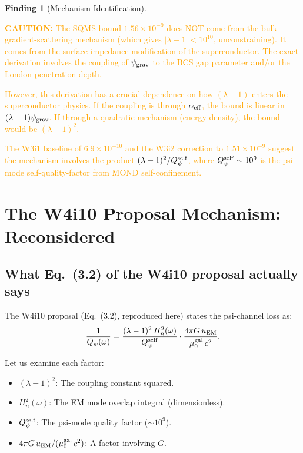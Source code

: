 \documentclass[11pt]{article}
\newcommand{\lam}{\lambda}
\newcommand{\lbone}{|\lambda - 1|}
\newcommand{\Qpsi}{Q_\psi}
\newcommand{\ee}[1]{\times 10^{#1}}
\newcommand{\Heff}{H_n}
\newcommand{\muG}{\mu_0^{\rm gal}}
\newcommand{\psigrav}{\psi_{\rm grav}}
\newcommand{\caution}[1]{\textcolor{orange}{\textbf{CAUTION:} #1}}
\theoremstyle{definition}
\newtheorem{finding}[theorem]{Finding}
\theoremstyle{remark}
\begin{document}
\begin{finding}[Mechanism Identification]
\label{find:mechanism}
\caution{The SQMS bound $1.56\ee{-9}$ does NOT come from the bulk
gradient-scattering mechanism (which gives $\lbone < 10^{10}$,
unconstraining). It comes from the surface impedance modification
of the superconductor. The exact derivation involves the coupling
of $\psigrav$ to the BCS gap parameter and/or the London penetration
depth.

However, this derivation has a crucial dependence on how $(\lam-1)$
enters the superconductor physics. If the coupling is through
$\alpha_{\rm eff}$, the bound is linear in $(\lam-1)\psigrav$.
If through a quadratic mechanism (energy density), the bound would
be $(\lam-1)^2$.

The W3i1 baseline of $6.9\ee{-10}$ and the W3i2 correction to
$1.51\ee{-9}$ suggest the mechanism involves the product
$(\lam-1)^2/\Qpsi^{\rm self}$, where $\Qpsi^{\rm self} \sim 10^9$
is the psi-mode self-quality-factor from MOND self-confinement.}
\end{finding}


\section{The W4i10 Proposal Mechanism: Reconsidered}
\label{sec:w4i10_mechanism}

\subsection{What Eq.~(3.2) of the W4i10 proposal actually says}

The W4i10 proposal (Eq.~(3.2), reproduced here) states the psi-channel
loss as:
\begin{equation}
\frac{1}{\Qpsi(\omega)} = \frac{(\lam-1)^2\,\Heff^2(\omega)}{\Qpsi^{\rm self}}
\cdot\frac{4\pi G\,u_{\rm EM}}{\muG\,c^2}.
\label{eq:w4i10_loss}
\end{equation}

Let us examine each factor:
\begin{itemize}[nosep]
\item $(\lam-1)^2$: The coupling constant squared.
\item $\Heff^2(\omega)$: The EM mode overlap integral (dimensionless).
\item $\Qpsi^{\rm self}$: The psi-mode quality factor ($\sim 10^9$).
\item $4\pi G\,u_{\rm EM}/(\muG\,c^2)$: A factor involving $G$.
\end{itemize}
\end{document}
